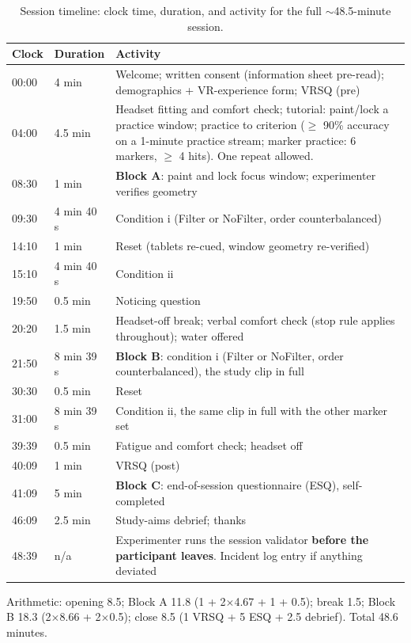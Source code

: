 \begin{longtable}{p{}|p{}|p{}}
\caption{Session timeline: clock time, duration, and activity for the full $\sim$48.5-minute session.}\\
\hline
\textbf{Clock} & \textbf{Duration} & \textbf{Activity} \\
\hline
\endhead
\hline
00:00 & 4 min & Welcome; written consent (information sheet pre-read); demographics + VR-experience form; VRSQ (pre) \\
04:00 & 4.5 min & Headset fitting and comfort check; tutorial: paint/lock a practice window; practice to criterion ($\geq$ 90\% accuracy on a 1-minute practice stream; marker practice: 6 markers, $\geq$ 4 hits). One repeat allowed. \\
08:30 & 1 min & \textbf{Block A}: paint and lock focus window; experimenter verifies geometry \\
09:30 & 4 min 40 s & Condition i (Filter or NoFilter, order counterbalanced) \\
14:10 & 1 min & Reset (tablets re-cued, window geometry re-verified) \\
15:10 & 4 min 40 s & Condition ii \\
19:50 & 0.5 min & Noticing question \\
20:20 & 1.5 min & Headset-off break; verbal comfort check (stop rule applies throughout); water offered \\
21:50 & 8 min 39 s & \textbf{Block B}: condition i (Filter or NoFilter, order counterbalanced), the study clip in full \\
30:30 & 0.5 min & Reset \\
31:00 & 8 min 39 s & Condition ii, the same clip in full with the other marker set \\
39:39 & 0.5 min & Fatigue and comfort check; headset off \\
40:09 & 1 min & VRSQ (post) \\
41:09 & 5 min & \textbf{Block C}: end-of-session questionnaire (ESQ), self-completed \\
46:09 & 2.5 min & Study-aims debrief; thanks \\
48:39 & n/a & Experimenter runs the session validator \textbf{before the participant leaves}. Incident log entry if anything deviated \\
\hline
\end{longtable}

Arithmetic: opening 8.5; Block A 11.8 (1 + 2$\times$4.67 + 1 + 0.5); break 1.5; Block B 18.3
(2$\times$8.66 + 2$\times$0.5); close 8.5 (1 VRSQ + 5 ESQ + 2.5 debrief). Total 48.6 minutes.

